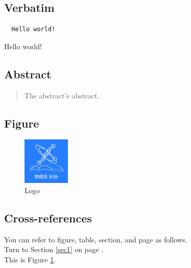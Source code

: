 \documentclass[12pt]{article}
\begin{document}
\subsection{Verbatim}
\begin{verbatim}
  Hello world!
\end{verbatim}
Hello world!
\subsection{Abstract}
\begin{abstract}
  The abstract's abstract.\label{abs}
\end{abstract}
\subsection{Figure}
\begin{figure}[!htp] 
  \centering
  \includegraphics[width=0.2\textwidth]{logo.jpg}
  \caption{Logo}\label{logo}
\end{figure} %
\subsection{Cross-references}
You can refer to figure, table, section, and page as follows.\\
Turn to Section \ref{sec1} on page \pageref{sec1}.\\
This is Figure \ref{logo}.
\end{document}
